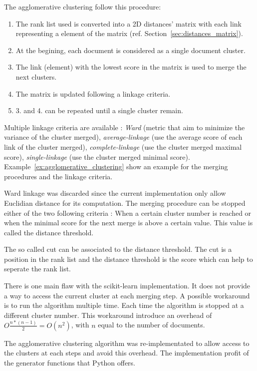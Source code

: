 The agglomerative clustering follow this procedure:
\begin{enumerate}
  \item The rank list used is converted into a 2D distances' matrix with each link representing a element of the matrix (ref. Section~\ref{sec:distances_matrix}).
  \item At the begining, each document is considered as a single document cluster.
  \item The link (element) with the lowest score in the matrix is used to merge the next clusters.
  \item The matrix is updated following a linkage criteria.
  \item 3. and 4. can be repeated until a single cluster remain.
\end{enumerate}

Multiple linkage criteria are available : \textit{Ward} (metric that aim to minimize the variance of the cluster merged), \textit{average-linkage} (use the average score of each link of the cluster merged), \textit{complete-linkage} (use the cluster merged maximal score), \textit{single-linkage} (use the cluster merged minimal score).
Example~\ref{ex:agglomerative_clustering} show an example for the merging procedures and the linkage criteria.

Ward linkage was discarded since the current implementation only allow Euclidian distance for its computation.
The merging procedure can be stopped either of the two following criteria : When a certain cluster number is reached or when the minimal score for the next merge is above a certain value.
This value is called the distance threshold.

The so called cut can be associated to the distance threshold.
The cut is a position in the rank list and the distance threshold is the score which can help to seperate the rank list.

There is one main flaw with the scikit-learn implementation.
It does not provide a way to access the current cluster at each merging step.
A possible workaround is to run the algorithm multiple time.
Each time the algorithm is stopped at a different cluster number.
This workaround introduce an overhead of $O\frac{n * (n - 1)}{2} = O(n^2)$, with $n$ equal to the number of documents.

The agglomerative clustering algorithm was re-implementated to allow access to the clusters at each steps and avoid this overhead.
The implementation profit of the generator functions that Python offers.

